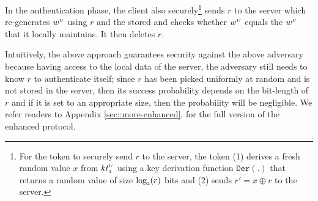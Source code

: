 In the authentication phase, the client also securely\footnote{For the token to securely send $r$ to the server, the token (1) derives a fresh random value $x$ from ${kt}_{\scriptscriptstyle 3}^{\scriptscriptstyle U}$ using a key derivation function $\mathtt{Der}(.)$ that returns a random value of size $\log_{\scriptscriptstyle 2}(r)$ bits and  (2) sends $r'=x\oplus r$ to the server.} sends $r$ to the server which re-generates  $w^{\scriptscriptstyle U}$ using $r$ and the stored \VC{\verifier} and checks whether $w^{\scriptscriptstyle U}$ equals the $w^{\scriptscriptstyle U}$ that it locally maintains. It then deletes $r$. 

Intuitively, the above approach guarantees security against the above adversary because having access to the local data of the server, the adversary still needs to know $r$ to authenticate itself; since $r$ has been picked uniformly at random and is not stored in the server, then its success probability depends on the bit-length of $r$ and if it is set to an appropriate size, then the probability will be negligible. 
%
We refer readers to  Appendix \ref{sec::more-enhanced}, for the full version of the enhanced protocol. 


